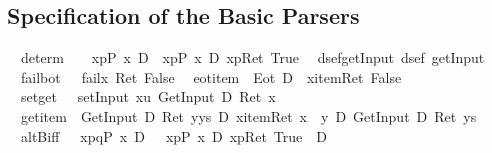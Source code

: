 \subsection{Specification of the Basic Parsers}
\begin{isabellebody}
\isanewline
{}\isanewline
\ \ determ{\isacharcolon}\ \ \ {\isachardoublequote}{\isasymturnstile}\ {\isasymlangle}x{\isasymleftarrow}p{\isasymrangle}{\isacharparenleft}P\ x{\isacharparenright}\ {\isasymlongleftrightarrow}\isactrlsub D\ {\isacharbrackleft}{\isacharhash}\ x{\isasymleftarrow}p{\isacharbrackright}{\isacharparenleft}P\ x{\isacharparenright}\ {\isasymand}\isactrlsub D\ {\isasymlangle}x{\isasymleftarrow}p{\isasymrangle}{\isacharparenleft}Ret\ True{\isacharparenright}{\isachardoublequote}\isanewline
\ \ dsef{\isacharunderscore}getInput{\isacharcolon}\ {\isachardoublequote}dsef\ getInput{\isachardoublequote}\isanewline
\ \ fail{\isacharunderscore}bot{\isacharcolon}\ {\isachardoublequote}{\isasymturnstile}\ {\isacharbrackleft}{\isacharhash}\ fail{\isacharbrackright}{\isacharparenleft}{\isasymlambda}x{\isachardot}\ Ret\ False{\isacharparenright}{\isachardoublequote}\isanewline
\ \ eot{\isacharunderscore}item{\isacharcolon}\ {\isachardoublequote}{\isasymturnstile}\ Eot\ {\isasymlongrightarrow}\isactrlsub D\ {\isacharbrackleft}{\isacharhash}\ x{\isasymleftarrow}item{\isacharbrackright}{\isacharparenleft}Ret\ False{\isacharparenright}{\isachardoublequote}\isanewline
\ \ set{\isacharunderscore}get{\isacharcolon}\ \ {\isachardoublequote}{\isasymturnstile}\ {\isasymlangle}setInput\ x{\isasymrangle}{\isacharparenleft}{\isasymlambda}u{\isachardot}\ GetInput\ {\isacharequal}\isactrlsub D\ Ret\ x{\isacharparenright}{\isachardoublequote}\isanewline
\ \ get{\isacharunderscore}item{\isacharcolon}\ {\isachardoublequote}{\isasymturnstile}\ GetInput\ {\isacharequal}\isactrlsub D\ Ret\ {\isacharparenleft}y{\isacharhash}ys{\isacharparenright}\ {\isasymlongrightarrow}\isactrlsub D\ {\isasymlangle}x{\isasymleftarrow}item{\isasymrangle}{\isacharparenleft}Ret\ {\isacharparenleft}x\ {\isacharequal}\ y{\isacharparenright}\ {\isasymand}\isactrlsub D\ GetInput\ {\isacharequal}\isactrlsub D\ Ret\ ys{\isacharparenright}{\isachardoublequote}\isanewline
\ \ altB{\isacharunderscore}iff{\isacharcolon}\ {\isachardoublequote}{\isasymturnstile}\ {\isacharbrackleft}{\isacharhash}\ x{\isasymleftarrow}p{\isasymparallel}q{\isacharbrackright}{\isacharparenleft}P\ x{\isacharparenright}\ {\isasymlongleftrightarrow}\isactrlsub D\ {\isacharparenleft}\ {\isacharbrackleft}{\isacharhash}\ x{\isasymleftarrow}p{\isacharbrackright}{\isacharparenleft}P\ x{\isacharparenright}\ {\isasymand}\isactrlsub D\ {\isasymlangle}x{\isasymleftarrow}p{\isasymrangle}{\isacharparenleft}Ret\ True{\isacharparenright}\ {\isacharparenright}\ {\isasymor}\isactrlsub D\ \isanewline

\end{isabellebody}
